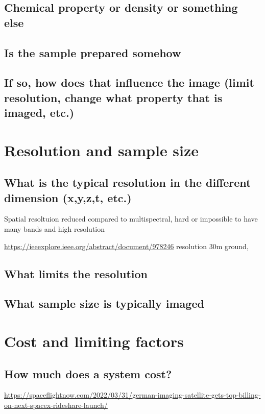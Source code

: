 \documentclass[a4paper]{article}
\begin{document}
    \subsection*{Chemical property or density or something else}

    \subsection*{Is the sample prepared somehow}

    \subsection*{If so, how does that influence the image (limit resolution, change 
    what property that is imaged, etc.)}


\section{Resolution and sample size}

    \subsection*{What is the typical resolution in the different dimension (x,y,z,t, etc.)}
        
        Spatial resoltuion reduced compared to multispectral, hard or impossible to have many bands and high resolution
        
        \url{https://ieeexplore.ieee.org/abstract/document/978246} 
        resolution 30m ground, 

    \subsection*{What limits the resolution}

    \subsection*{What sample size is typically imaged }


\section{Cost and limiting factors}

    \subsection*{How much does a system cost?}
        \url{https://spaceflightnow.com/2022/03/31/german-imaging-satellite-gets-top-billing-on-next-spacex-rideshare-launch/}
\end{document}
